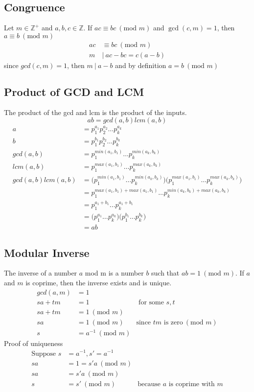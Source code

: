 \documentclass{article}
\theoremstyle{mytheoremstyle}
\theoremstyle{mytheoremstyle}
\theoremstyle{myproblemstyle}
\newcommand{\modm}[1]{\ (\text{mod }#1)}
\begin{document}
    \subsection*{Congruence}
    Let $m\in \mathbb{Z}^+$ and $a,b,c\in \mathbb{Z}$. If
    $ac\equiv bc \modm{m}$ and $\gcd(c,m)=1$, then $a\equiv b \modm{m}$
    \begin{align*}
        ac&\equiv bc \modm{m} \\
        m\ &|\ ac - bc = c(a-b)
    \end{align*}
    since $gcd(c,m) = 1$, then $m\ |\ a-b$ and by definition $a = b \modm{m}$

    \subsection*{Product of GCD and LCM}
    The product of the gcd and lcm is the product of the inputs.
    \[
        ab = gcd(a,b) lcm(a,b)
    \]
    \begin{align*}
        a &= p_1^{a_1}p_2^{a_2}\dots p_k^{a_k} \\
        b &= p_1^{b_1}p_2^{b_2}\dots p_k^{b_k} \\
        gcd(a,b) &= p_1^{min(a_1,b_1)}\dots p_k^{min(a_k,b_k)} \\
        lcm(a,b) &= p_1^{max(a_1,b_1)}\dots p_k^{max(a_k,b_k)} \\
        gcd(a,b)lcm(a,b) &= \Big(p_1^{min(a_1,b_1)}\dots p_k^{min(a_k,b_k)}\Big)
        \Big(p_1^{max(a_1,b_1)}\dots p_k^{max(a_k,b_k)}\Big) \\
                         &= p_1^{max(a_1,b_1) + max(a_1,b_1)}\dots p_k^{min(a_k,b_k) + max(a_k,b_k)} \\
                         &= p_1^{a_1 + b_1}\dots p_k^{a_1+b_1} \\
                         &= \Big(p_1^{a_1}\dots p_k^{a_k}\Big)\Big(p_1^{b_1}\dots p_k^{b_k}\Big) \\
                         &= ab
    \end{align*}

    \subsection*{Modular Inverse}
    The inverse of a number $a$ mod m is a number $b$ such that $ab = 1
    \modm{m}$. If $a$ and $m$ is coprime, then the inverse exists and is unique.
    \begin{align*}
        gcd(a,m) &= 1 \\
        sa+tm &= 1 &\text{ for some } s,t \\
        sa+tm &= 1 \modm{m} \\
        sa &= 1 \modm{m} & \text{since $tm$ is zero} \modm{m} \\
        s &= a^{-1} \modm{m}
    \end{align*}
    Proof of uniqueness
    \begin{align*}
        \text{Suppose } s &= a^{-1}, s' = a^{-1} \\
        sa &= 1 = s'a \modm{m} \\
        sa &= s'a \modm{m} \\
        s &= s' \modm{m} & \text{because $a$ is coprime with $m$}
    \end{align*}
\end{document}
